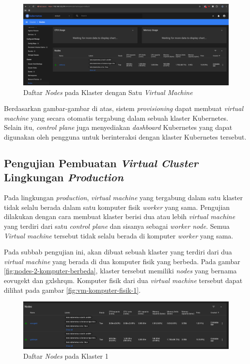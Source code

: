 \begin{figure}[H]
  \centering
  \includegraphics[scale=0.3]{gambar/kubernetes-dashboard-access-local-with-nodes.png}
  \caption{Daftar \emph{Nodes} pada Klaster dengan Satu \emph{Virtual Machine}}
  \label{fig:daftar-nodes-pada-dashboard-kubernetes}
\end{figure}

Berdasarkan gambar-gambar di atas, sistem \emph{provisioning} dapat membuat
\emph{virtual machine} yang secara otomatis tergabung dalam sebuah klaster Kubernetes.
Selain itu, \emph{control plane} juga menyediakan \emph{dashboard} Kubernetes yang dapat
digunakan oleh pengguna untuk berinteraksi dengan klaster Kubernetes tersebut.

\subsection{Pengujian Pembuatan \emph{Virtual Cluster} Lingkungan \emph{Production}}
\label{subsec:pengujian-pembuatan-vc-prod}

Pada lingkungan \emph{production}, \emph{virtual machine} yang tergabung dalam
satu klaster tidak selalu berada dalam satu komputer fisik \emph{worker} yang sama.
Pengujian dilakukan dengan cara membuat klaster berisi dua atau lebih \emph{virtual machine}
yang terdiri dari satu \emph{control plane} dan sisanya sebagai \emph{worker node}.
Semua \emph{Virtual machine} tersebut tidak selalu berada di komputer \emph{worker}
yang sama.

Pada subbab pengujian ini, akan dibuat sebuah klaster yang terdiri dari dua
\emph{virtual machine} yang berada di dua komputer fisik yang berbeda. Pada gambar
\ref{fig:nodes-2-komputer-berbeda}, klaster tersebut memiliki \emph{nodes} yang
bernama eovugekt dan gxlshrqm. Komputer fisik dari dua \emph{virtual machine}
tersebut dapat dilihat pada gambar \ref{fig:vm-komputer-fisik-1}.

\begin{figure}[H]
  \centering
  \includegraphics[scale=0.3]{gambar/two-nodes-difference-computer-dashboard.png}
  \caption{Daftar \emph{Nodes} pada Klaster 1}
  \label{fig:nodes-2-komputer-berbeda-1}
\end{figure}


